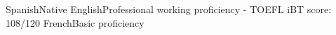 \begin{cvskills}
	\cvskill
    	{Spanish}{Native}
	\cvskill
    	{English}{Professional working proficiency - TOEFL iBT score: 108/120}
    \cvskill
    	{French}{Basic proficiency}
\end{cvskills}
